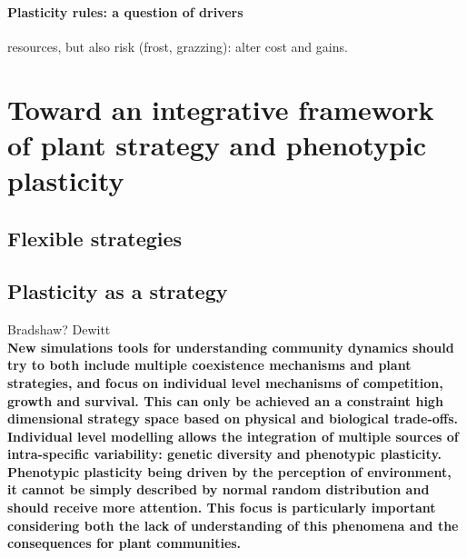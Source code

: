 \paragraph{Plasticity rules: a question of drivers}

resources, but also risk (frost, grazzing): alter cost and gains.





\textbf{}

\section{Toward an integrative framework of plant strategy and phenotypic plasticity}


\subsection{Flexible strategies}

\subsection{Plasticity as a strategy}
Bradshaw?
Dewitt\\



\textbf{New simulations tools for understanding community dynamics should try to both include multiple coexistence mechanisms and plant strategies, and focus on individual level mechanisms of competition, growth and survival. This can only be achieved an a constraint high dimensional strategy space based on physical and biological trade-offs. Individual level modelling allows the integration of multiple sources of intra-specific variability: genetic diversity and phenotypic plasticity. Phenotypic plasticity being driven by the perception of environment, it cannot be simply described by normal random distribution and should receive more attention. This focus is particularly important considering both the lack of understanding of this phenomena and the consequences for plant communities.  }


